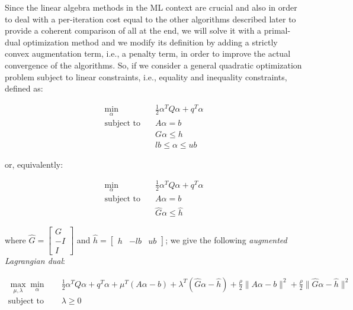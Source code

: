 \bigskip

Since the linear algebra methods in the ML context are crucial and also in order to deal with a per-iteration cost equal to the other algorithms described later to provide a coherent comparison of all at the end, we will solve it with a primal-dual optimization method and we modify its definition by adding a strictly convex augmentation term, i.e., a penalty term, in order to improve the actual convergence of the algorithms. So, if we consider a general quadratic optimization problem subject to linear constraints, i.e., equality and inequality constraints, defined as:

\begin{equation}
    \begin{aligned} 
        \min_{\alpha} \quad & \frac{1}{2} \alpha^T Q \alpha + q^T \alpha \\
            \textrm{subject to} \quad & A \alpha = b \\ & G \alpha \leq h \\ & lb \leq \alpha \leq ub
    \end{aligned}
\end{equation}

or, equivalently:

\begin{equation}
    \begin{aligned}
        \min_{\alpha} \quad & \frac{1}{2} \alpha^T Q \alpha + q^T \alpha \\
            \textrm{subject to} \quad & A \alpha = b \\ & \hat{G} \alpha \leq \hat{h}
    \end{aligned}
\end{equation}

where $\hat{G} =
\begin{bmatrix}
 G \\
-I \\
 I 
\end{bmatrix}$ and $\hat{h} =
\begin{bmatrix}
h & -lb & ub
\end{bmatrix}$; we give the following \emph{augmented Lagrangian dual}:

\begin{equation} \label{eq:svc_gen_aug_lagrangian_dual}
	\begin{aligned}
		    \max_{\mu,\lambda} \min_{\alpha} \quad & \frac{1}{2} \alpha^T Q \alpha + q^T \alpha + \mu^T (A \alpha - b) + \lambda^T (\hat{G} \alpha - \hat{h}) + \frac{\rho}{2} \| A \alpha - b \|^2 + \frac{\rho}{2} \| \hat{G} \alpha - \hat{h} \|^2 \\
    \text{subject to} \quad & \lambda \geq 0
	\end{aligned}
\end{equation}

